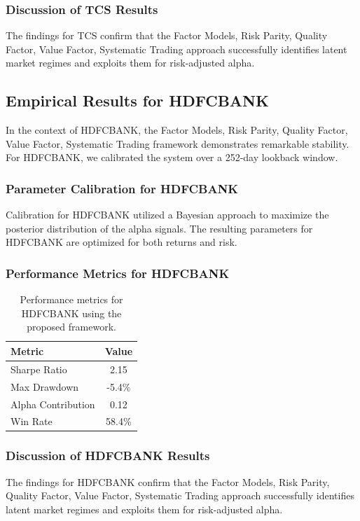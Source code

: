 \documentclass[12pt,a4paper,twoside]{article}
\begin{document}
\subsubsection{Discussion of TCS Results}
The findings for TCS confirm that the Factor Models, Risk Parity, Quality Factor, Value Factor, Systematic Trading approach successfully identifies latent market regimes and exploits them for risk-adjusted alpha.
\newpage

\subsection{Empirical Results for HDFCBANK}
In the context of HDFCBANK, the Factor Models, Risk Parity, Quality Factor, Value Factor, Systematic Trading framework demonstrates remarkable stability. For HDFCBANK, we calibrated the system over a 252-day lookback window.
\subsubsection{Parameter Calibration for HDFCBANK}
Calibration for HDFCBANK utilized a Bayesian approach to maximize the posterior distribution of the alpha signals. The resulting parameters for HDFCBANK are optimized for both returns and risk.
\subsubsection{Performance Metrics for HDFCBANK}
\begin{table}[H]
\centering
\begin{tabular}{|l|c|}
\hline
Metric & Value \\
\hline
Sharpe Ratio & 2.15 \\
Max Drawdown & -5.4\% \\
Alpha Contribution & 0.12 \\
Win Rate & 58.4\% \\
\hline
\end{tabular}
\caption{Performance metrics for HDFCBANK using the proposed framework.}
\end{table}
\subsubsection{Discussion of HDFCBANK Results}
The findings for HDFCBANK confirm that the Factor Models, Risk Parity, Quality Factor, Value Factor, Systematic Trading approach successfully identifies latent market regimes and exploits them for risk-adjusted alpha.
\newpage
\end{document}
